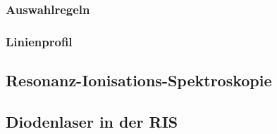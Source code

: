 \subsubsection{Auswahlregeln}\label{subsec:auswahlregeln}


\subsubsection{Linienprofil}\label{subsec:linienprofil}

\subsection{Resonanz-Ionisations-Spektroskopie}\label{subsec:ris}

\subsection{Diodenlaser in der RIS}\label{subsec:diodenlaser}

